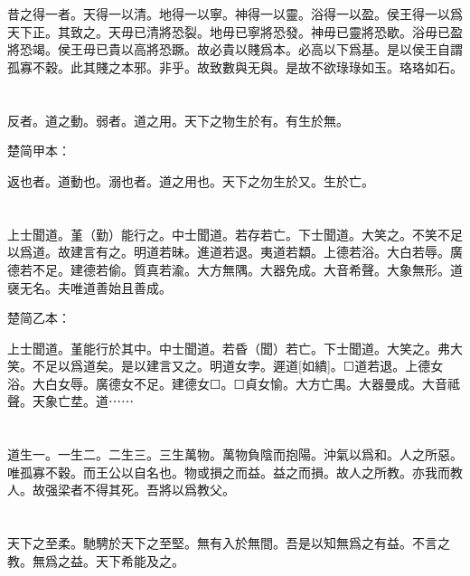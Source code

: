 \documentclass[a5paper]{ctexbook}
\begin{document}
    \chapter{}

    昔之得一者。天得一以清。地得一以寧。神得一以靈。浴得一以盈。侯王得一以爲天下正。其致之。天毋已清將恐裂。地毋已寧將恐發。神毋已靈將恐歇。浴毋已盈將恐竭。侯王毋已貴以高將恐蹶。故必貴以賤爲本。必高以下爲基。是以侯王自謂孤寡不穀。此其賤之本邪。非乎。故致數與无與。是故不欲琭琭如玉。珞珞如石。

    \chapter{}

    反者。道之動。弱者。道之用。天下之物生於有。有生於無。

    楚简甲本：

    返也者。道動也。溺也者。道之用也。天下之勿生於又。生於亡。

    \chapter{}

    上士聞道。堇（勤）能行之。中士聞道。若存若亡。下士聞道。大笑之。不笑不足以爲道。故建言有之。明道若昧。進道若退。夷道若纇。上德若浴。大白若辱。廣德若不足。建德若偷。質真若渝。大方無隅。大器免成。大音希聲。大象無形。道襃无名。夫唯道善始且善成。

    楚简乙本：

    上士聞道。堇能行於其中。中士聞道。若昏（聞）若亡。下士聞道。大笑之。弗大笑。不足以爲道矣。是以建言又之。明道女孛。遲道[如繢]。☐道若退。上德女浴。大白女辱。廣德女不足。建德女☐。☐貞女愉。大方亡禺。大器曼成。大音祗聲。天象亡坓。道⋯⋯

    \chapter{}

    道生一。一生二。二生三。三生萬物。萬物負陰而抱陽。沖氣以爲和。人之所惡。唯孤寡不穀。而王公以自名也。物或損之而益。益之而損。故人之所教。亦我而教人。故强梁者不得其死。吾將以爲教父。

    \chapter{}

    天下之至柔。馳騁於天下之至堅。無有入於無間。吾是以知無爲之有益。不言之教。無爲之益。天下希能及之。
\end{document}
